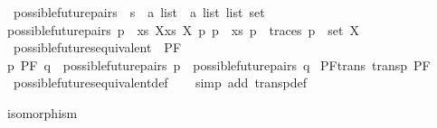 \begin{isabellebody}
\ possible{\isacharunderscore}{\kern0pt}future{\isacharunderscore}{\kern0pt}pairs\ {\isacharcolon}{\kern0pt}{\isacharcolon}{\kern0pt}\ {\isacartoucheopen}{\isacharprime}{\kern0pt}s\ {\isasymRightarrow}\ {\isacharparenleft}{\kern0pt}{\isacharprime}{\kern0pt}a\ list\ {\isasymtimes}\ {\isacharprime}{\kern0pt}a\ list\ list{\isacharparenright}{\kern0pt}\ set{\isacartoucheclose}\isanewline
\ \ \isanewline
{\isacartoucheopen}possible{\isacharunderscore}{\kern0pt}future{\isacharunderscore}{\kern0pt}pairs\ p\ {\isasymequiv}\ {\isacharbraceleft}{\kern0pt}{\isacharparenleft}{\kern0pt}xs{\isacharcomma}{\kern0pt}\ X{\isacharparenright}{\kern0pt}{\isacharbar}{\kern0pt}xs\ X{\isachardot}{\kern0pt}\ {\isasymexists}p{\isacharprime}{\kern0pt}{\isachardot}{\kern0pt}\ p\ {\isasymmapsto}{\isachardollar}{\kern0pt}\ xs\ p{\isacharprime}{\kern0pt}\ {\isasymand}\ traces\ p{\isacharprime}{\kern0pt}\ {\isacharequal}{\kern0pt}\ {\isacharparenleft}{\kern0pt}set\ X{\isacharparenright}{\kern0pt}{\isacharbraceright}{\kern0pt}{\isacartoucheclose}\isanewline
\isanewline
{}\isamarkupfalse%
\ possible{\isacharunderscore}{\kern0pt}futures{\isacharunderscore}{\kern0pt}equivalent\ {\isacharparenleft}{\kern0pt}\ {\isacartoucheopen}{\isasymsimeq}PF{\isacartoucheclose}\ {}{}{\isacharparenright}{\kern0pt}\ \isanewline
{\isacartoucheopen}p\ {\isasymsimeq}PF\ q\ {\isasymequiv}\ {\isacharparenleft}{\kern0pt}possible{\isacharunderscore}{\kern0pt}future{\isacharunderscore}{\kern0pt}pairs\ p\ {\isacharequal}{\kern0pt}\ possible{\isacharunderscore}{\kern0pt}future{\isacharunderscore}{\kern0pt}pairs\ q{\isacharparenright}{\kern0pt}{\isacartoucheclose}\isanewline
\isanewline
{}\isamarkupfalse%
\ PF{\isacharunderscore}{\kern0pt}trans{\isacharcolon}{\kern0pt}\ {\isachardoublequoteopen}transp\ {\isacharparenleft}{\kern0pt}{\isasymsimeq}PF{\isacharparenright}{\kern0pt}{\isachardoublequoteclose}\isanewline
%
\isadelimproof
\ \ %
\endisadelimproof
%
\isatagproof
{}\isamarkupfalse%
\ possible{\isacharunderscore}{\kern0pt}futures{\isacharunderscore}{\kern0pt}equivalent{\isacharunderscore}{\kern0pt}def\isanewline
\ \ \isamarkupfalse%
\ {\isacharparenleft}{\kern0pt}simp\ add{\isacharcolon}{\kern0pt}\ transp{\isacharunderscore}{\kern0pt}def{\isacharparenright}{\kern0pt}%
\endisatagproof
{\isafoldproof}%
%
\isadelimproof
%
\endisadelimproof
%
\begin{isamarkuptext}%
isomorphism%
\end{isamarkuptext}\isamarkuptrue%

\end{isabellebody}
